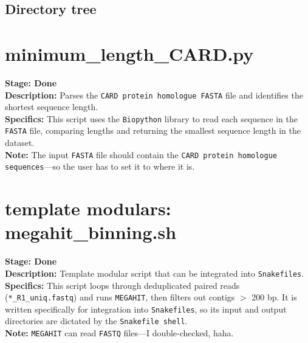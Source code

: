 \documentclass[11pt]{report}
\begin{document}
{\subsection{Directory tree}


\linenumbers*
\section{minimum\_length\_CARD.py}
\textbf{Stage: Done} \\   
\textbf{Description:} Parses the \texttt{CARD protein homologue FASTA} file and identifies the shortest sequence length. \\
\textbf{Specifics:} This script uses the \texttt{Biopython} library to read each sequence in the \texttt{FASTA} file, comparing lengths and returning the smallest sequence length in the dataset. \\
\textbf{Note:} The input \texttt{FASTA} file should contain the \texttt{CARD protein homologue sequences}—so the user has to set it to where it is.


\linenumbers*
\section{template modulars: megahit\_binning.sh} 
\textbf{Stage: Done} \\   
\textbf{Description:} Template modular script that can be integrated into \texttt{Snakefiles}. \\
\textbf{Specifics:} This script loops through deduplicated paired reads (\texttt{*\_R1\_uniq.fastq}) and runs \texttt{MEGAHIT}, then filters out contigs $>$ 200 bp. It is written specifically for integration into \texttt{Snakefiles}, so its input and output directories are dictated by the \texttt{Snakefile shell}. \\
\textbf{Note:} \texttt{MEGAHIT} can read \texttt{FASTQ} files—I double-checked, haha. \\

}
\end{document}
